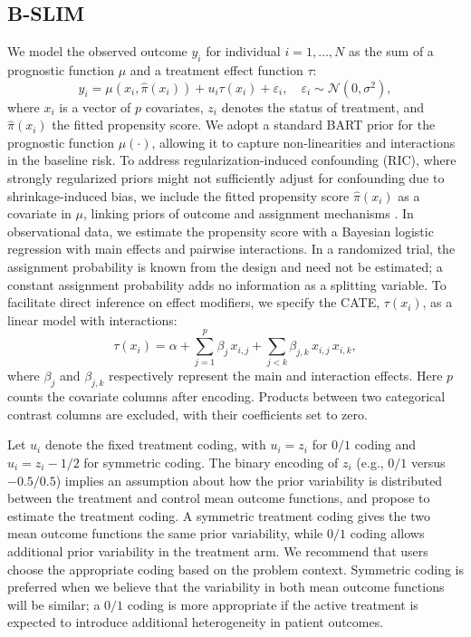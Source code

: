 \documentclass[12pt]{article}
\begin{document}
\subsection{B-SLIM}
We model the observed outcome $y_i$ for individual $i=1,\dots,N$ as the sum of a prognostic function $\mu$ and a treatment effect function $\tau$:
\begin{equation}
\label{main_eq}
    y_{i} = \mu(x_{i}, \hat{\pi}(x_i)) + u_{i}\tau(x_{i}) + \varepsilon_{i}, \quad \varepsilon_i \sim \mathcal{N}(0, \sigma^{2}),
\end{equation}
where $x_i$ is a vector of $p$ covariates, $z_i$ denotes the status of treatment, and $\hat{\pi}(x_i)$ the fitted propensity score. We adopt a standard BART prior for the prognostic function $\mu(\cdot)$, allowing it to capture non-linearities and interactions in the baseline risk. To address regularization-induced confounding (RIC), where strongly regularized priors might not sufficiently adjust for confounding due to shrinkage-induced bias, we include the fitted propensity score $\hat{\pi}(x_i)$ as a covariate in $\mu$, linking priors of outcome and assignment mechanisms \citep{hahn2020bayesian, linero2024nonparametric}. In observational data, we estimate the propensity score with a Bayesian logistic regression with main effects and pairwise interactions. In a randomized trial, the assignment probability is known from the design and need not be estimated; a constant assignment probability adds no information as a splitting variable. To facilitate direct inference on effect modifiers, we specify the CATE, $\tau(x_i)$, as a linear model with interactions:
\begin{equation}
\label{linear_tau}
    \tau(x_{i}) = \alpha + \sum_{j=1}^{p} \beta_{j}\, x_{i,j} + \sum_{j<k} \beta_{j,k}\, x_{i,j}\,x_{i,k},
\end{equation}
where $\beta_j$ and $\beta_{j,k}$ respectively represent the main and interaction effects. Here $p$ counts the covariate columns after encoding. Products between two categorical contrast columns are excluded, with their coefficients set to zero.

Let $u_i$ denote the fixed treatment coding, with $u_i=z_i$ for $0/1$ coding and $u_i=z_i-1/2$ for symmetric coding. The binary encoding of $z_i$ (e.g., $0/1$ versus $-0.5/0.5$) implies an assumption about how the prior variability is distributed between the treatment and control mean outcome functions, and \cite{hahn2020bayesian} propose to estimate the treatment coding. A symmetric treatment coding gives the two mean outcome functions the same prior variability, while $0/1$ coding allows additional prior variability in the treatment arm. We recommend that users choose the appropriate coding based on the problem context. Symmetric coding is preferred when we believe that the variability in both mean outcome functions will be similar; a $0/1$ coding is more appropriate if the active treatment is expected to introduce additional heterogeneity in patient outcomes.
\end{document}
